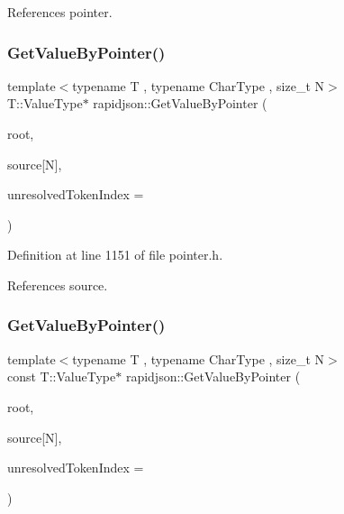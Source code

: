 References pointer.

\mbox{\label{namespacerapidjson_a24060eafc78078b03c2db84fef65b5dd}} 
\subsubsection{\texorpdfstring{GetValueByPointer()}{GetValueByPointer()}\hspace{0.1cm}{\footnotesize\ttfamily [3/4]}}
{\footnotesize\ttfamily template$<$typename T , typename Char\+Type , size\+\_\+t N$>$ \\
T\+::\+Value\+Type$\ast$ rapidjson\+::\+Get\+Value\+By\+Pointer (\begin{DoxyParamCaption}\item[{T \&}]{root,  }\item[{const Char\+Type(\&)}]{source\mbox{[}\+N\mbox{]},  }\item[{size\+\_\+t $\ast$}]{unresolved\+Token\+Index = {} }\end{DoxyParamCaption})}



Definition at line 1151 of file pointer.\+h.


\begin{DoxyCode}{0}

\end{DoxyCode}


References source.

\mbox{\label{namespacerapidjson_acca88ad99e931abf827f11d324174e9a}} 
\subsubsection{\texorpdfstring{GetValueByPointer()}{GetValueByPointer()}\hspace{0.1cm}{\footnotesize\ttfamily [4/4]}}
{\footnotesize\ttfamily template$<$typename T , typename Char\+Type , size\+\_\+t N$>$ \\
const T\+::\+Value\+Type$\ast$ rapidjson\+::\+Get\+Value\+By\+Pointer (\begin{DoxyParamCaption}\item[{const T \&}]{root,  }\item[{const Char\+Type(\&)}]{source\mbox{[}\+N\mbox{]},  }\item[{size\+\_\+t $\ast$}]{unresolved\+Token\+Index = {} }\end{DoxyParamCaption})}



